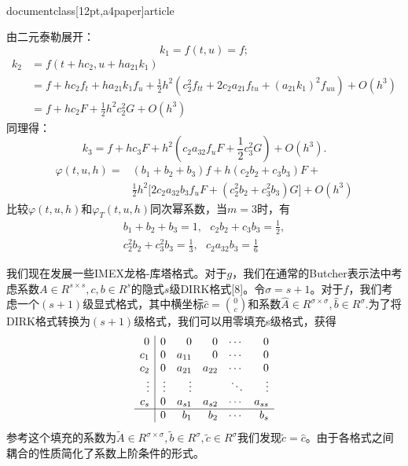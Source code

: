 \\documentclass[12pt,a4paper]{article}
\begin{document}
由二元泰勒展开：
\begin{equation*}
k_{1}=f(t,u)=f;
\end{equation*}
\begin{align*}
k_{2}&=f(t+hc_{2},u+ha_{21}k_{1})\\
&=f+hc_{2}f_{t}+ha_{21}k_{1}f_{u}+\frac{1}{2}h^2(c_{2}^2f_{tt}+2c_{2}a_{21}f_{tu}+(a_{21}k_{1})^2f_{uu})+O(h^3)\\
&=f+hc_{2}F+\frac{1}{2}h^2c_{2}^2G+O(h^3)
\end{align*}
同理得：
\begin{equation*}
k_{3}=f+hc_{3}F+h^2(c_{2}a_{32}f_{u}F+\frac{1}{2}c_{3}^2G)+O(h^3).
\end{equation*}
\begin{align*}
\varphi(t,u,h)=&(b_{1}+b_{2}+b_{3})f+h(c_{2}b_{2}+c_{3}b_{3})F+\\
&\frac{1}{2}h^2\biggl[2c_{2}a_{32}b_{3}f_{u}F+(c_{2}^2b_{2}+c_{3}^2b_{3})G\biggr]+O(h^3)
\end{align*}
比较$\varphi(t,u,h)$和$\varphi_{T}(t,u,h)$同次幂系数，当$m=3$时，有
\begin{gather*}
b_{1}+b_{2}+b_{3}=1,~~~c_{2}b_{2}+c_{3}b_{3}=\frac{1}{2},\\
c_{2}^2b_{2}+c_{3}^2b_{3}=\frac{1}{3},~~~c_{2}a_{32}b_{3}=\frac{1}{6}
\end{gather*}



我们现在发展一些IMEX龙格-库塔格式。对于$g$，我们在通常的Butcher表示法中考虑系数$A\in R^{s\times s} ,c,b\in R^s$的隐式$s$级DIRK格式[8]。令$\sigma=s+1$。对于$f$，我们考虑一个$(s+1)$级显式格式，其中横坐标$\widehat{c}=\binom{0}{c}$和系数$\widehat{A}\in R^{\sigma\times \sigma},\widehat{b}\in
R^{\sigma}.$为了将DIRK格式转换为$(s+1)$级格式，我们可以用零填充s级格式，获得
\[
\begin{array}{r|r r r r  r}
0 &  0 & 0 & 0  & \cdots & 0 \\
c_{1} & 0 & a_{11} & 0 & \cdots & 0 \\
c_{2} & 0 & a_{21} & a_{22} & \cdots & 0 \\
\vdots & \vdots &  \vdots &  &  \ddots &  \vdots \\
c_{s} & 0 & a_{s1} & a_{s2} & \cdots & a_{ss} \\
\hline
 & 0 & b_{1} & b_{2} & \cdots & b_{s} 
\end{array}
\]
参考这个填充的系数为$\tilde{A}\in R^{\sigma\times\sigma},\tilde{b}\in R^{\sigma},\tilde{c}\in R^{\sigma}$我们发现$\tilde{c}=\widehat{c}$。由于各格式之间耦合的性质简化了系数上阶条件的形式。
\end{document}
